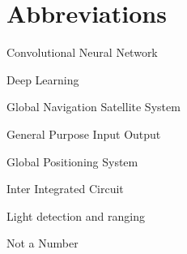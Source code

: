 \chapter*{Abbreviations}

\begin{description}
\setlength{\itemsep}{-11pt}
\setlength{\leftmargin}{900pt}

\item[CNN] Convolutional Neural Network

\item[DL] Deep Learning

\item[GNNS] Global Navigation Satellite System
\item[GPIO] General Purpose Input Output
\item[GPS] Global Positioning System

\item[I2C] Inter Integrated Circuit

\item[LIDAR] Light detection and ranging

\item[NaN] Not a Number

\end{description}
